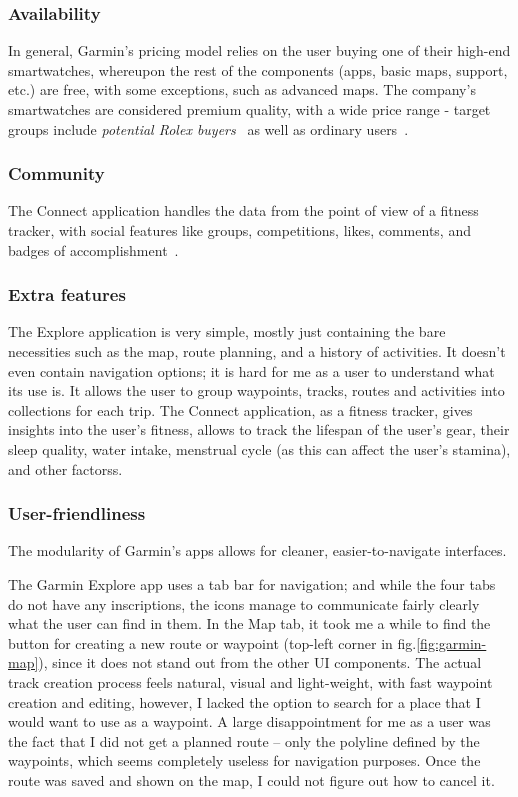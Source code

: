 \subsubsection*{Availability}
In general, Garmin's pricing model relies on the user buying one of their high-end smartwatches, whereupon the rest of the components (apps, basic maps, support, etc.) are free, with some exceptions, such as advanced maps. 
The company's smartwatches are considered premium quality, with a wide price range - target groups include \textit{potential Rolex buyers}~\cite{garmin-expensive} as well as ordinary users~\cite{garmin-watches-review}.
\subsubsection*{Community}
The Connect application handles the data from the point of view of a fitness tracker, with social features like groups, competitions, likes, comments, and badges of accomplishment~\cite{garmin-connect}.
\subsubsection*{Extra features}
The Explore application is very simple, mostly just containing the bare necessities such as the map, route planning, and a history of activities.
It doesn't even contain navigation options; it is hard for me as a user to understand what its use is.
It allows the user to group waypoints, tracks, routes and activities into collections for each trip.
The Connect application, as a fitness tracker, gives insights into the user's fitness, allows to track the lifespan of the user's gear, their sleep quality, water intake, menstrual cycle (as this can affect the user's stamina), and other factorss.
\subsubsection*{User-friendliness}
The modularity of Garmin's apps allows for cleaner, easier-to-navigate interfaces.

The Garmin Explore app uses a tab bar for navigation; and while the four tabs do not have any inscriptions, the icons manage to communicate fairly clearly what the user can find in them.
In the Map tab, it took me a while to find the button for creating a new route or waypoint (top-left corner in fig.\ref{fig:garmin-map}), since it does not stand out from the other UI components.
The actual track creation process feels natural, visual and light-weight, with fast waypoint creation and editing, however, I lacked the option to search for a place that I would want to use as a waypoint.
A large disappointment for me as a user was the fact that I did not get a planned route -- only the polyline defined by the waypoints, which seems completely useless for navigation purposes.
Once the route was saved and shown on the map, I could not figure out how to cancel it.


